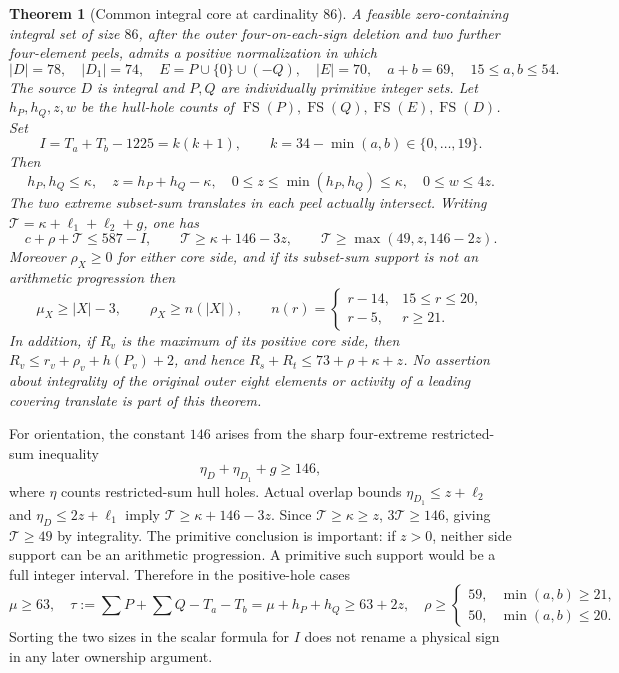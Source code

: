 \documentclass[11pt,letterpaper]{article}
\newcommand{\FS}{\operatorname{FS}}
\newcommand{\card}[1]{\lvert#1\rvert}
\newtheorem{theorem}{Theorem}[section]
\theoremstyle{definition}\newtheorem{definition}[theorem]{Definition}
\begin{document}
\begin{theorem}[Common integral core at cardinality 86]\label{thm:structure86}
A feasible zero-containing integral set of size $86$, after the outer
four-on-each-sign deletion and two further four-element peels, admits a
positive normalization in which
\[
\card D=78,\quad\card{D_1}=74,\quad
E=P\cup\{0\}\cup(-Q),\quad\card E=70,
\quad a+b=69,\quad15\le a,b\le54.
\]
The source $D$ is integral and $P,Q$ are individually primitive integer
sets. Let $h_P,h_Q,z,w$ be the hull-hole counts of $\FS(P),\FS(Q),
\FS(E),\FS(D)$. Set
\[
I=T_a+T_b-1225=k(k+1),\qquad k=34-\min(a,b)\in\{0,\ldots,19\}.
\]
Then
\[
h_P,h_Q\le\kappa,\quad
z=h_P+h_Q-\kappa,\quad0\le z\le\min(h_P,h_Q)\le\kappa,
\quad0\le w\le4z.
\]
The two extreme subset-sum translates in each peel actually intersect.
Writing $\mathcal T=\kappa+\ell_1+\ell_2+g$, one has
\begin{equation}\label{eq:common-structural}
c+\rho+\mathcal T\le587-I,\qquad
\mathcal T\ge\kappa+146-3z,\qquad
\mathcal T\ge\max(49,z,146-2z).
\end{equation}
Moreover $\rho_X\ge0$ for either core side, and if its subset-sum
support is not an arithmetic progression then
\[
\mu_X\ge |X|-3,\qquad
\rho_X\ge n(|X|),\qquad
n(r)=\begin{cases}r-14,&15\le r\le20,\\r-5,&r\ge21.\end{cases}
\]
In addition, if $R_v$ is the maximum of its positive core side, then
$R_v\le r_v+\rho_v+h(P_v)+2$, and hence
$R_s+R_t\le73+\rho+\kappa+z$.
No assertion about integrality of the original outer eight elements or
activity of a leading covering translate is part of this theorem.
\end{theorem}

For orientation, the constant $146$ arises from the sharp four-extreme
restricted-sum inequality
\[
\eta_D+\eta_{D_1}+g\ge146,
\]
where $\eta$ counts restricted-sum hull holes. Actual overlap bounds
$\eta_{D_1}\le z+\ell_2$ and $\eta_D\le2z+\ell_1$ imply
$\mathcal T\ge\kappa+146-3z$. Since $\mathcal T\ge\kappa\ge z$,
$3\mathcal T\ge146$, giving $\mathcal T\ge49$ by integrality.
The primitive conclusion is important: if $z>0$, neither side support
can be an arithmetic progression. A primitive such support would be
a full integer interval. Therefore in the positive-hole cases
\begin{equation}\label{eq:common-positive-floors}
\mu\ge63,\quad \tau:=\sum P+\sum Q-T_a-T_b
=\mu+h_P+h_Q\ge63+2z,
\quad \rho\ge\begin{cases}59,&\min(a,b)\ge21,\\50,&\min(a,b)\le20.
\end{cases}
\end{equation}
Sorting the two sizes in the scalar formula for $I$ does not rename a
physical sign in any later ownership argument.
\end{document}
